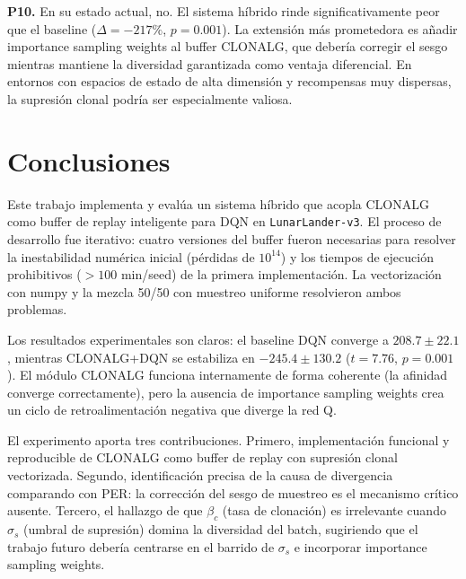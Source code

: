 \documentclass[12pt,a4paper]{article}
\begin{document}
\textbf{P10.} En su estado actual, no. El sistema híbrido rinde
significativamente peor que el baseline ($\Delta=-217\%$, $p=0.001$). La
extensión más prometedora es añadir importance sampling weights al buffer
CLONALG, que debería corregir el sesgo mientras mantiene la diversidad
garantizada como ventaja diferencial. En entornos con espacios de estado de
alta dimensión y recompensas muy dispersas, la supresión clonal podría ser
especialmente valiosa.
 
\section{Conclusiones}
\label{sec:conclusiones}
 
Este trabajo implementa y evalúa un sistema híbrido que acopla CLONALG como
buffer de replay inteligente para DQN en \texttt{LunarLander-v3}. El proceso
de desarrollo fue iterativo: cuatro versiones del buffer fueron necesarias
para resolver la inestabilidad numérica inicial (pérdidas de $10^{14}$) y los
tiempos de ejecución prohibitivos ($>100$ min/seed) de la primera
implementación. La vectorización con numpy y la mezcla 50/50 con muestreo
uniforme resolvieron ambos problemas.
 
Los resultados experimentales son claros: el baseline DQN converge a
$208.7 \pm 22.1$, mientras CLONALG+DQN se estabiliza en $-245.4 \pm 130.2$
($t=7.76$, $p=0.001$). El módulo CLONALG funciona internamente de forma
coherente (la afinidad converge correctamente), pero la ausencia de
importance sampling weights crea un ciclo de retroalimentación negativa que
diverge la red Q.
 
El experimento aporta tres contribuciones. Primero, implementación funcional
y reproducible de CLONALG como buffer de replay con supresión clonal
vectorizada. Segundo, identificación precisa de la causa de divergencia
comparando con PER: la corrección del sesgo de muestreo es el mecanismo
crítico ausente. Tercero, el hallazgo de que $\beta_c$ (tasa de clonación)
es irrelevante cuando $\sigma_s$ (umbral de supresión) domina la diversidad
del batch, sugiriendo que el trabajo futuro debería centrarse en el barrido
de $\sigma_s$ e incorporar importance sampling weights.
 


 
\end{document}
